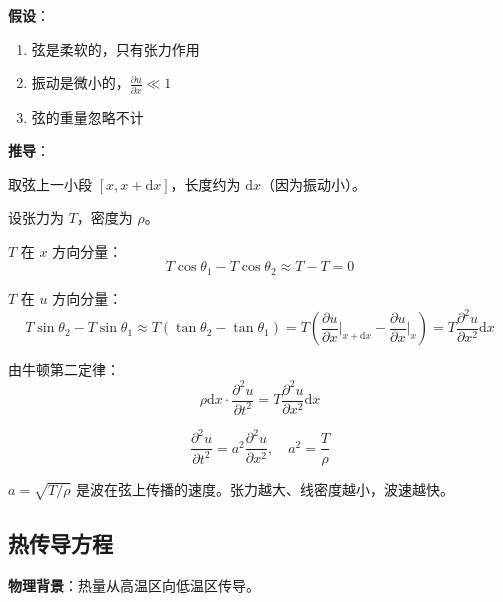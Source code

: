 \textbf{假设}：
\begin{enumerate}
    \item 弦是柔软的，只有张力作用
    \item 振动是微小的，$\frac{\partial u}{\partial x} \ll 1$
    \item 弦的重量忽略不计
\end{enumerate}

\textbf{推导}：

取弦上一小段 $[x, x+\mathrm{d}x]$，长度约为 $\mathrm{d}x$（因为振动小）。

设张力为 $T$，密度为 $\rho$。

$T$ 在 $x$ 方向分量：
\begin{equation}
    T\cos\theta_1 - T\cos\theta_2 \approx T - T = 0
\end{equation}

$T$ 在 $u$ 方向分量：
\begin{equation}
    T\sin\theta_2 - T\sin\theta_1 \approx T\left(\tan\theta_2 - \tan\theta_1\right) = T\left(\frac{\partial u}{\partial x}\Big|_{x+\mathrm{d}x} - \frac{\partial u}{\partial x}\Big|_x\right) = T\frac{\partial^2 u}{\partial x^2}\mathrm{d}x
\end{equation}

由牛顿第二定律：
\begin{equation}
    \rho\mathrm{d}x \cdot \frac{\partial^2 u}{\partial t^2} = T\frac{\partial^2 u}{\partial x^2}\mathrm{d}x
\end{equation}

\begin{zhongyao}[一维波动方程]
\[
    \frac{\partial^2 u}{\partial t^2} = a^2\frac{\partial^2 u}{\partial x^2}, \quad a^2 = \frac{T}{\rho}
\]
\end{zhongyao}
\begin{wulibj}[物理意义]
$a = \sqrt{T/\rho}$ 是波在弦上传播的速度。张力越大、线密度越小，波速越快。
\end{wulibj}

\subsection{热传导方程}

\textbf{物理背景}：热量从高温区向低温区传导。

